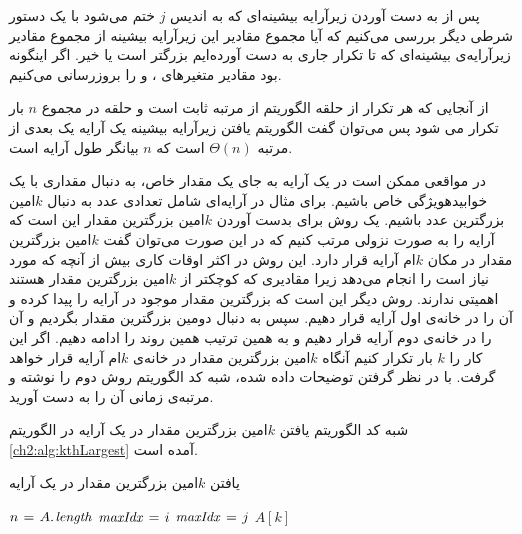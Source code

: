پس از به دست آوردن زیرآرایه بیشینه‌ای که به اندیس {$j$} ختم می‌شود با یک دستور شرطی دیگر بررسی می‌کنیم که آیا مجموع مقادیر این زیرآرایه بیشینه از مجموع مقادیر زیرآرایه‌‌ی بیشینه‌ای که تا تکرار جاری به دست آورده‌ایم بزرگتر است یا خیر. اگر اینگونه بود مقادیر متغیرهای {}، {} و {} را بروزرسانی می‌کنیم.

از آنجایی که هر تکرار از حلقه الگوریتم {} از مرتبه ثابت است و حلقه در مجموع {$n$} بار تکرار می شود پس می‌توان گفت الگوریتم یافتن زیرآرایه بیشینه یک آرایه یک بعدی از مرتبه {$\Theta (n)$} است که {$n$} بیانگر طول آرایه است.

 در مواقعی ممکن است در یک آرایه به جای یک مقدار خاص، به دنبال مقداری با یک ‌خوابیده{ویژگی} خاص باشیم. برای مثال در آرایه‌ای شامل تعدادی عدد به دنبال {$k$}امین بزرگترین عدد باشیم. یک روش برای بدست آوردن {$k$}امین بزرگترین مقدار این است که آرایه را به صورت نزولی مرتب کنیم که در این صورت می‌توان گفت {$k$}امین بزرگترین مقدار در مکان {$k$}ام آرایه قرار دارد. این روش در اکثر اوقات کاری بیش از آنچه که مورد نیاز است را انجام می‌دهد زیرا مقادیری که کوچکتر از {$k$}امین بزرگترین مقدار هستند اهمیتی ندارند. روش دیگر این است که بزرگترین مقدار موجود در آرایه را پیدا کرده و  آن را در خانه‌ی اول آرایه قرار دهیم. سپس به دنبال دومین بزرگترین مقدار بگردیم و آن را در خانه‌ی دوم آرایه قرار دهیم و به همین ترتیب همین روند را ادامه دهیم. اگر این کار را {$k$} بار تکرار کنیم آنگاه {$k$}امین بزرگترین مقدار در خانه‌ی {$k$}ام آرایه قرار خواهد گرفت. با در نظر گرفتن توضیحات داده ‌شده، شبه کد الگوریتم روش دوم را نوشته و مرتبه‌ی زمانی آن را به دست آورید.


شبه کد الگوریتم یافتن {$k$}امین بزرگترین مقدار در یک آرایه در الگوریتم {\eqref{ch2:alg:kthLargest}} آمده است.

\begin{algorithm}
\caption{یافتن {$k$}امین بزرگترین مقدار در یک آرایه}\label{ch2:alg:kthLargest}
\begin{latin}
\begin{algorithmic}[1]
		\State	$n \mathrel{\hspace{1pt}=\hspace{1pt}} A.\hspace*{1pt}\mathit{length}$
				\State	$\mathit{maxIdx} \mathrel{\hspace{1pt}=\hspace{1pt}} i $
								\State	$\mathit{maxIdx} \mathrel{\hspace{1pt}=\hspace{1pt}} j$						
						\EndIf
				\EndFor
				\State	{}
		\EndFor
		\State	\Return $A[k]$
\EndFunction
\end{algorithmic}
\end{latin}
\end{algorithm}

